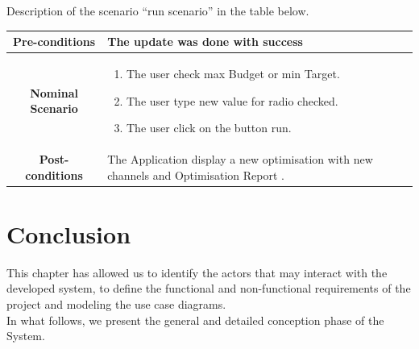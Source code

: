 \documentclass[12pt]{article}
\begin{document}
	 Description of the scenario ``run scenario'' in the table below.
	
	\begin{table}
		\centering
		\begin{tabular}{|c|p{10cm}|}
			\hline 	
			\textbf{Pre-conditions } & The update was done with success \\ 
			\hline                     
			\textbf{Nominal Scenario } & \begin{enumerate}
				\item The user check max Budget or min Target.
				\item The user type new value for radio checked.
				\item The user click on the button run. 
			\end{enumerate} \\ 
			\hline 
			\textbf{Post-conditions} & The Application display a new optimisation with new channels and Optimisation Report  . \\
			\hline 
		\end{tabular}
	\end{table}
	\clearpage
	\newpage
	
	\section{Conclusion}
	This chapter has allowed us to identify the actors that may interact with the developed system, to define the functional and non-functional requirements of the project and modeling the use case diagrams.
	\\
	In what follows, we present the general and detailed conception phase of the System.  
	
\end{document}
